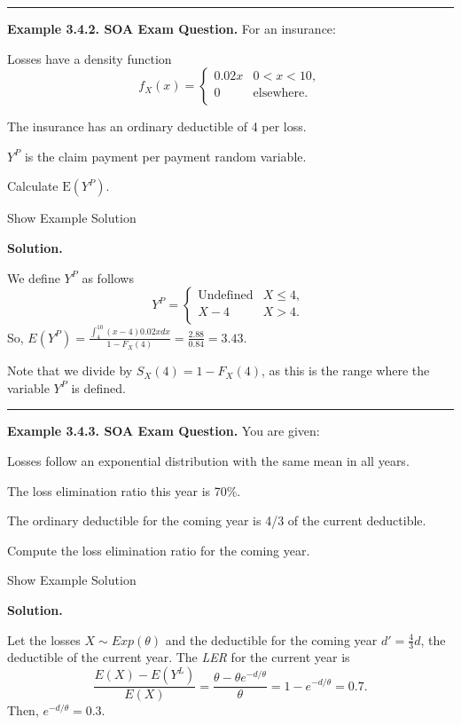 \documentclass[]{book}
\theoremstyle{definition}
\theoremstyle{definition}
\theoremstyle{definition}
\theoremstyle{remark}
\begin{document}
\begin{center}\rule{0.5\linewidth}{\linethickness}\end{center}

\textbf{Example 3.4.2. SOA Exam Question.} For an insurance:

Losses have a density function
\[f_{X}\left( x \right) = \left\{ \begin{matrix}
    0.02x & 0 < x  < 10, \\
    0 & \text{elsewhere.} \\
    \end{matrix} \right. \]

The insurance has an ordinary deductible of 4 per loss.

\(Y^{P}\) is the claim payment per payment random variable.

Calculate \(\mathrm{E}\left( Y^{P} \right)\).

Show Example Solution

\hypertarget{toggleExampleLoss.4.2}{}
\textbf{Solution.}

We define \(Y^P\) as follows \[Y^{P} = \left\{ \begin{matrix}
\text{Undefined} & X \leq 4, \\
X - 4 & X > 4. \\
\end{matrix} \right.\ \] So,
\(E\left( Y^{P} \right) = \frac{\int_{4}^{10}\left( x - 4 \right)0.02xdx}{{1 - F}_{X}\left( 4 \right)} = \frac{2.88}{0.84} = 3.43\).

Note that we divide by \(S_X(4)=1-F_X(4)\), as this is the range where
the variable \(Y^P\) is defined.

\begin{center}\rule{0.5\linewidth}{\linethickness}\end{center}

\textbf{Example 3.4.3. SOA Exam Question.} You are given:

Losses follow an exponential distribution with the same mean in all
years.

The loss elimination ratio this year is 70\%.

The ordinary deductible for the coming year is 4/3 of the current
deductible.

Compute the loss elimination ratio for the coming year.

Show Example Solution

\hypertarget{toggleExampleLoss.4.3}{}
\textbf{Solution.}

Let the losses \(X\sim Exp(\theta)\) and the deductible for the coming
year \(d' = \frac{4}{3}d\), the deductible of the current year. The
\emph{LER} for the current year is
\[\frac{E\left( X \right) - E\left( Y^{L} \right)}{E\left( X \right)} = \frac{\theta - \theta e^{- d / \theta}}{\theta} = 1 - e^{- d / \theta} = 0.7.\]
Then, \(e^{- d / \theta} = 0.3\).
\end{document}
